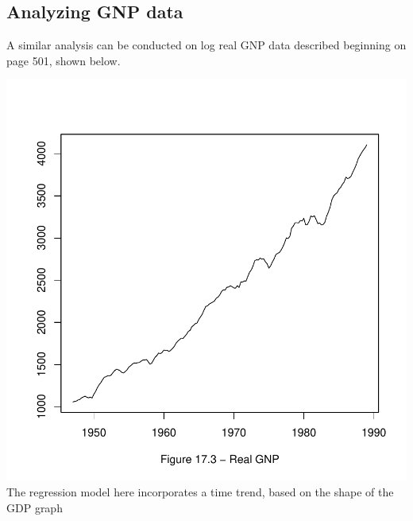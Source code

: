 \documentclass[a4paper]{article}
\renewcommand{\~}{\perispomeni}%
\begin{document}
\subsection{Analyzing GNP data}
A similar analysis can be conducted on log real GNP data described beginning on page 501, shown below.
\begin{Schunk}
\end{Schunk}
\includegraphics{Companion-057}
The regression model here incorporates a time trend, based on the shape of the GDP graph
\end{document}

